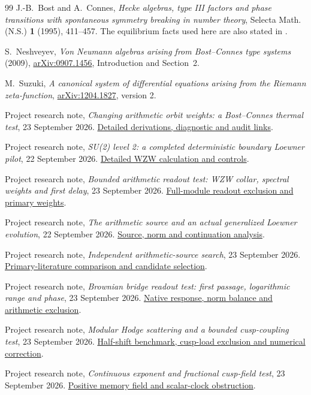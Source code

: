 \begin{thebibliography}{99}
J.-B.~Bost and A.~Connes,
\emph{Hecke algebras, type III factors and phase transitions with
spontaneous symmetry breaking in number theory},
Selecta Math. (N.S.) \textbf{1} (1995), 411--457.
The equilibrium facts used here are also stated in \cite{Neshveyev}.

S.~Neshveyev, \emph{Von Neumann algebras arising from Bost--Connes
type systems} (2009),
\href{https://arxiv.org/html/0907.1456}{arXiv:0907.1456},
Introduction and Section~2.

M.~Suzuki, \emph{A canonical system of differential equations arising
from the Riemann zeta-function},
\href{https://arxiv.org/abs/1204.1827}{arXiv:1204.1827}, version 2.

Project research note, \emph{Changing arithmetic orbit weights:
a Bost--Connes thermal test}, 23 September 2026.
\href{notes/ARITHMETIC_ORBIT_WEIGHTS_AND_BOST_CONNES_TEST_20260923.md}{Detailed derivations, diagnostic and audit links}.

Project research note, \emph{SU(2) level 2: a completed deterministic
boundary Loewner pilot}, 22 September 2026.
\href{../notes/SU2_LEVEL2_DETERMINISTIC_LOEWNER_PILOT_20260922.md}{Detailed WZW calculation and controls}.

Project research note, \emph{Bounded arithmetic readout test: WZW
collar, spectral weights and first delay}, 23 September 2026.
\href{notes/BOUNDED_ARITHMETIC_READOUT_TEST_20260923.md}{Full-module readout exclusion and primary weights}.

Project research note, \emph{The arithmetic source and an actual
generalized Loewner evolution}, 22 September 2026.
\href{../notes/ARITHMETIC_SOURCE_AND_GENERALIZED_LOEWNER_EVOLUTION_20260922.md}{Source, norm and continuation analysis}.

Project research note, \emph{Independent arithmetic-source search},
23 September 2026.
\href{notes/INDEPENDENT_ARITHMETIC_SOURCE_SEARCH_20260923.md}{Primary-literature comparison and candidate selection}.

Project research note, \emph{Brownian bridge readout test: first
passage, logarithmic range and phase}, 23 September 2026.
\href{notes/BROWNIAN_BRIDGE_READOUT_TEST_20260923.md}{Native response, norm balance and arithmetic exclusion}.

Project research note, \emph{Modular Hodge scattering and a bounded
cusp-coupling test}, 23 September 2026.
\href{notes/MODULAR_HODGE_SCATTERING_AND_CUSP_COUPLING_TEST_20260923.md}{Half-shift benchmark, cusp-load exclusion and numerical correction}.

Project research note, \emph{Continuous exponent and fractional
cusp-field test}, 23 September 2026.
\href{notes/CONTINUOUS_EXPONENT_AND_FRACTIONAL_CUSP_TEST_20260923.md}{Positive memory field and scalar-clock obstruction}.
\end{thebibliography}
